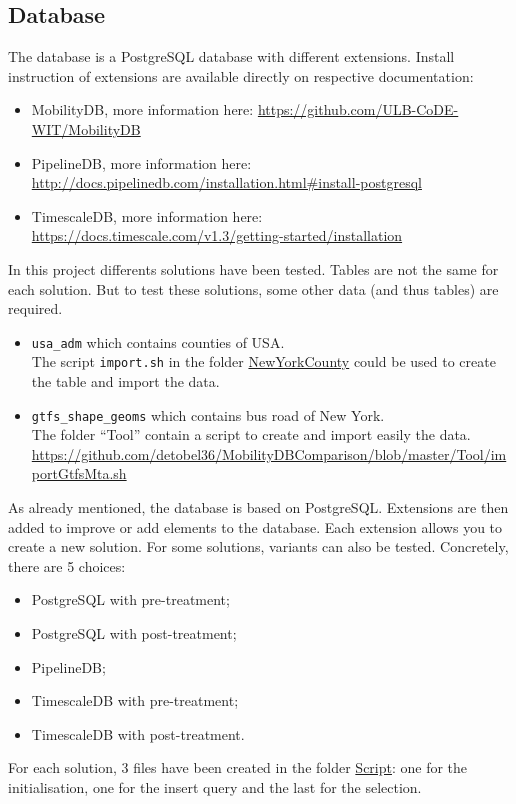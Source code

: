 \documentclass[a4paper,12pt]{article}
\begin{document}
    \subsection{Database}
        The database is a PostgreSQL database with different extensions. Install instruction of extensions are available directly on respective documentation:
        \begin{itemize}
            \item MobilityDB, more information here: \url{https://github.com/ULB-CoDE-WIT/MobilityDB}
            \item PipelineDB, more information here: \url{http://docs.pipelinedb.com/installation.html#install-postgresql}
            \item TimescaleDB, more information here: \url{https://docs.timescale.com/v1.3/getting-started/installation}
        \end{itemize}
        In this project differents solutions have been tested. Tables are not the same for each solution. But to test these solutions, some other data (and thus tables) are required.
        \begin{itemize}
            \item \verb|usa_adm| which contains counties of USA.\\
                The script \verb|import.sh| in the folder \href{https://github.com/detobel36/MobilityDBComparison/tree/master/Tool/NewYorkCounty}{NewYorkCounty} could be used to create the table and import the data.
            \item \verb|gtfs_shape_geoms| which contains bus road of New York.\\
                The folder ``Tool'' contain a script to create and import easily the data. \url{https://github.com/detobel36/MobilityDBComparison/blob/master/Tool/importGtfsMta.sh}
        \end{itemize}
        
        As already mentioned, the database is based on PostgreSQL. Extensions are then added to improve or add elements to the database. Each extension allows you to create a new solution. For some solutions, variants can also be tested. Concretely, there are 5 choices:
        \begin{itemize}
            \item PostgreSQL with pre-treatment;
            \item PostgreSQL with post-treatment;
            \item PipelineDB;
            \item TimescaleDB with pre-treatment;
            \item TimescaleDB with post-treatment.
        \end{itemize}
        For each solution, 3 files have been created in the folder \href{https://github.com/detobel36/MobilityDBComparison/tree/master/Script}{Script}: one for the initialisation, one for the insert query and the last for the selection.\\
        
\end{document}
